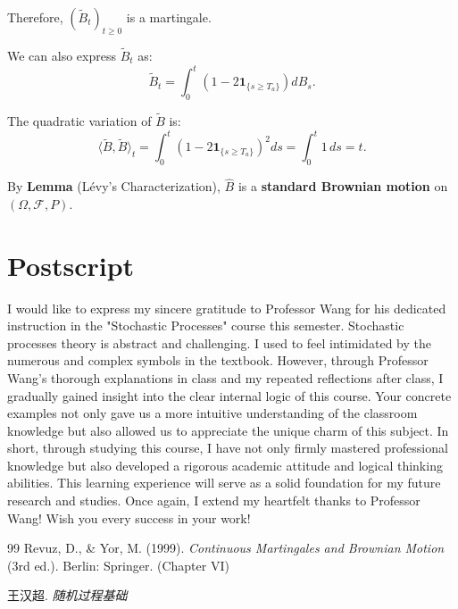 \documentclass[12pt,a4paper]{article}
\theoremstyle{definition}
\begin{document}
Therefore, \( (\widetilde{B}_t)_{t \geq 0} \) is a martingale.

We can also express \( \widetilde{B}_t \) as:
\[
\widetilde{B}_t = \int_0^t \left( 1 - 2\mathbf{1}_{\{s \geq T_a\}} \right) dB_s.
\]

The quadratic variation of \( \widetilde{B} \) is:
\[
\langle \widetilde{B}, \widetilde{B} \rangle_t = \int_0^t \left( 1 - 2\mathbf{1}_{\{s \geq T_a\}} \right)^2 ds = \int_0^t 1 \, ds = t.
\]


By \textbf{Lemma } (Lévy's Characterization), $\hat{B}$ is a \textbf{standard Brownian motion} on $(\Omega, \mathcal{F}, P)$.
	\section{Postscript}
	I would like to express my sincere gratitude to Professor Wang for his dedicated instruction in the "Stochastic Processes" course this semester.
	Stochastic processes theory is abstract and challenging. I used to feel intimidated by the numerous and complex symbols in the textbook. However, through Professor Wang's thorough explanations in class and my repeated reflections after class, I gradually gained insight into the clear internal logic of this course. Your concrete examples not only gave us a more intuitive understanding of the classroom knowledge but also allowed us to appreciate the unique charm of this subject. In short, through studying this course, I have not only firmly mastered professional knowledge but also developed a rigorous academic attitude and logical thinking abilities. This learning experience will serve as a solid foundation for my future research and studies.
	Once again, I extend my heartfelt thanks to Professor Wang! Wish you every success in your work!
	
	
	\begin{thebibliography}{99}
		Revuz, D., 
		\& Yor, M. (1999). \textit{Continuous Martingales and Brownian Motion}
		(3rd ed.). Berlin: Springer. (Chapter VI)
		
		王汉超. 
		\textit{随机过程基础}
		
	\end{thebibliography}
\end{document}
